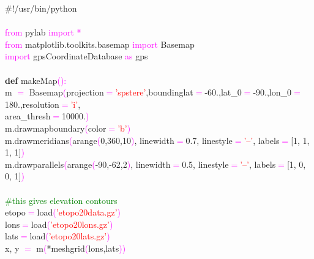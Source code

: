 {\scriptsize
\noindent \#!/usr/bin/python \\
\\
\textcolor{magenta}{from} pylab \textcolor{magenta}{import *} \\
\textcolor{magenta}{from} matplotlib.toolkits.basemap \textcolor{magenta}{import} Basemap \\
\textcolor{magenta}{import} gpsCoordinateDatabase \textcolor{magenta}{as} gps \\
\\
\textbf{def} makeMap\textcolor{magenta}{(}\textcolor{magenta}{)}\textcolor{magenta}{\textcolor{magenta}{:}} \\
\indent m \textcolor{magenta}{$=$} Basemap\textcolor{magenta}{(}projection\textcolor{magenta}{$=$}\textcolor{red}{'spstere'},boundinglat\textcolor{magenta}{$=$}-60.,lat\_0\textcolor{magenta}{$=$}-90.,lon\_0\textcolor{magenta}{$=$}180.,resolution\textcolor{magenta}{$=$}\textcolor{red}{'i'}, \\ \indent area\_thresh\textcolor{magenta}{$=$}10000.\textcolor{magenta}{)} \\
\indent m.drawmapboundary\textcolor{magenta}{(}color\textcolor{magenta}{$=$}\textcolor{red}{'b'}\textcolor{magenta}{)} \\
\indent m.drawmeridians\textcolor{magenta}{(}arange\textcolor{magenta}{(}0,360,10\textcolor{magenta}{)}, linewidth\textcolor{magenta}{$=$}0.7, linestyle\textcolor{magenta}{$=$}\textcolor{red}{'--'}, labels\textcolor{magenta}{$=$}[1, 1, 1, 1]\textcolor{magenta}{)} \\
\indent m.drawparallels\textcolor{magenta}{(}arange\textcolor{magenta}{(}-90,-62,2\textcolor{magenta}{)}, linewidth\textcolor{magenta}{$=$}0.5, linestyle\textcolor{magenta}{$=$}\textcolor{red}{'--'}, labels\textcolor{magenta}{$=$}[1, 0, 0, 1]\textcolor{magenta}{)} \\
\\
\indent \textcolor{green}{\#this gives elevation contours} \\
\indent etopo\textcolor{magenta}{$=$}load\textcolor{magenta}{(}\textcolor{red}{'etopo20data.gz'}\textcolor{magenta}{)} \\
\indent lons\textcolor{magenta}{$=$}load\textcolor{magenta}{(}\textcolor{red}{'etopo20lons.gz'}\textcolor{magenta}{)} \\
\indent lats\textcolor{magenta}{$=$}load\textcolor{magenta}{(}\textcolor{red}{'etopo20lats.gz'}\textcolor{magenta}{)} \\
\indent x, y \textcolor{magenta}{$=$} m\textcolor{magenta}{(}*meshgrid\textcolor{magenta}{(}lons,lats\textcolor{magenta}{)}\textcolor{magenta}{)} \\
}

